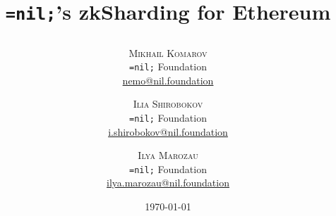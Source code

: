 \setlength{\droptitle}{-4\baselineskip} %

\pretitle{
    \begin{center}
    \end{center}
} %
\title{
    \begin{center}
        \Huge\bfseries \texttt{=nil;}'s zkSharding for Ethereum
    \end{center}
} %
\posttitle{
    \begin{center}
    \end{center}
} %
\author{%
    \textsc{Mikhail Komarov} \\[1ex] %
    \normalsize \texttt{=nil;} Foundation \\ %
    \normalsize \href{mailto:nemo@nil.foundation}{nemo@nil.foundation} \\
    \and 
    \textsc{Ilia Shirobokov} \\[1ex] %
    \normalsize \texttt{=nil;} Foundation \\ %
    \normalsize \href{mailto:i.shirobokov@nil.foundation}{i.shirobokov@nil.foundation} %
    \and 
    \textsc{Ilya Marozau} \\[1ex] %
    \normalsize \texttt{=nil;} Foundation \\ %
    \normalsize \href{mailto:ilya.marozau@nil.foundation}{ilya.marozau@nil.foundation} %
}
\date{\today} %
\renewcommand{\maketitlehookd}{%
    \begin{abstract}
        \noindent 
    \end{abstract}
}
